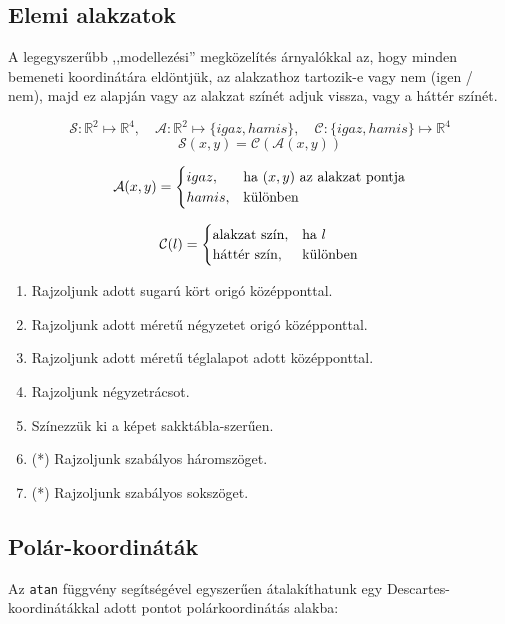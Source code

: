 \subsection{Elemi alakzatok}

A legegyszerűbb ,,modellezési'' megközelítés árnyalókkal az, hogy minden bemeneti koordinátára
eldöntjük, az alakzathoz tartozik-e vagy nem (igen / nem), majd ez alapján vagy az
alakzat színét adjuk vissza, vagy a háttér színét.

\begin{tcolorbox}
  
  $$
  \mathcal{S}: \mathbb{R}^2 \mapsto \mathbb{R}^4,\quad
  \mathcal{A}: \mathbb{R}^2 \mapsto \{igaz, hamis\},\quad
  \mathcal{C}: \{igaz, hamis\} \mapsto \mathbb{R}^4
  $$
  $$\mathcal{S}(x, y) = \mathcal{C}(\mathcal{A}(x,y))$$

  $$\mathcal{A}(x,y) = 
    \begin{cases}
      igaz,  &\text{ha~} (x, y) \text{~az alakzat pontja}\cr
      hamis, &\text{különben}
    \end{cases}
  $$

  $$\mathcal{C}(l) = 
    \begin{cases}
      \text{alakzat szín},  &\text{ha~} l\cr
      \text{háttér szín}, &\text{különben}
    \end{cases}
  $$

  \end{tcolorbox}

\progfeladatok

\begin{enumerate}
  \item Rajzoljunk adott sugarú kört origó középponttal.
  \item Rajzoljunk adott méretű négyzetet origó középponttal.
  \item Rajzoljunk adott méretű téglalapot adott középponttal.
  \item Rajzoljunk négyzetrácsot.
  \item Színezzük ki a képet sakktábla-szerűen.
  \item (*) Rajzoljunk szabályos háromszöget.
  \item (*) Rajzoljunk szabályos sokszöget.
\end{enumerate}

\subsection{Polár-koordináták}

Az \texttt{atan} függvény segítségével egyszerűen átalakíthatunk egy Descartes-koordinátákkal adott
pontot polárkoordinátás alakba:

